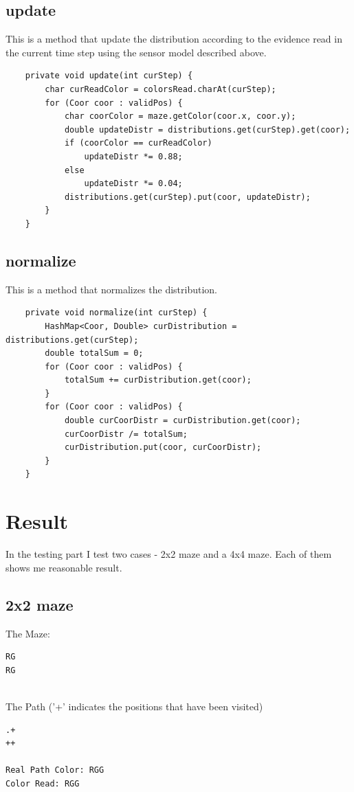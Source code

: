 \documentclass{article}
\begin{document}
\subsection{update}
This is a method that update the distribution according to the evidence read in the current time step using the sensor model described above.
\begin{lstlisting}
	private void update(int curStep) {
		char curReadColor = colorsRead.charAt(curStep);
		for (Coor coor : validPos) {
			char coorColor = maze.getColor(coor.x, coor.y);
			double updateDistr = distributions.get(curStep).get(coor);
			if (coorColor == curReadColor)
				updateDistr *= 0.88;
			else
				updateDistr *= 0.04;
			distributions.get(curStep).put(coor, updateDistr);
		}
	}
\end{lstlisting}

\subsection{normalize}
This is a method that normalizes the distribution.
\begin{lstlisting}
	private void normalize(int curStep) {
		HashMap<Coor, Double> curDistribution = distributions.get(curStep);
		double totalSum = 0;
		for (Coor coor : validPos) {
			totalSum += curDistribution.get(coor);
		}
		for (Coor coor : validPos) {
			double curCoorDistr = curDistribution.get(coor);
			curCoorDistr /= totalSum;
			curDistribution.put(coor, curCoorDistr);
		}
	}
\end{lstlisting}

\section{Result}
In the testing part I test two cases - 2x2 maze and a 4x4 maze. Each of them shows me reasonable result. 
\subsection{2x2 maze}
The Maze:
\begin{lstlisting}
RG
RG


\end{lstlisting}

The Path ('+' indicates the positions that have been visited)
\begin{lstlisting}
.+
++

Real Path Color: RGG
Color Read: RGG
\end{lstlisting}
\end{document}
